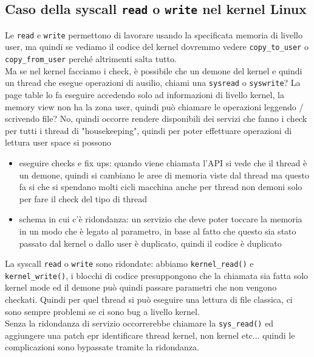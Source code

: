 \documentclass[12pt, oneside]{extbook}
\begin{document}
\subsection{Caso della syscall \texttt{read} o \texttt{write} nel kernel Linux}
Le \texttt{read} e \texttt{write} permettono di lavorare usando la specificata memoria di livello user, ma quindi se vediamo il codice del kernel dovremmo vedere \texttt{copy\_to\_user} o \texttt{copy\_from\_user} perché altrimenti salta tutto.\\Ma se nel kernel facciamo i check, è possibile che un demone del kernel e quindi un thread che esegue operazioni di ausilio, chiami una \texttt{sysread} o \texttt{syswrite}? La page table lo fa eseguire accedendo solo ad informazioni di livello kernel, la memory view non ha la zona user, quindi può chiamare le operazioni leggendo / scrivendo file? No, quindi occorre rendere disponibili dei servizi che fanno i check per tutti i thread di "housekeeping", quindi per poter effettuare operazioni di lettura user space si possono 
\begin{itemize}
\item eseguire checks e fix ups: quando viene chiamata l'API si vede che il thread è un demone, quindi si cambiano le aree di memoria viste dal thread ma questo fa si che si spendano molti cicli macchina anche per thread non demoni solo per fare il check del tipo di thread
\item schema in cui c'è ridondanza: un servizio che deve poter toccare la memoria in un modo che è legato al parametro, in base al fatto che questo sia stato passato dal kernel o dallo user è duplicato, quindi il codice è duplicato
\end{itemize}
La syscall \texttt{read} o \texttt{write} sono ridondate: abbiamo \texttt{kernel\_read()} e \texttt{kernel\_write()}, i blocchi di codice presuppongono che la chiamata sia fatta solo kernel mode ed il demone può quindi passare parametri che non vengono checkati. Quindi per quel thread si può eseguire una lettura di file classica, ci sono sempre problemi se ci sono bug a livello kernel.\\Senza la ridondanza di servizio occorrerebbe chiamare la \texttt{sys\_read()} ed aggiungere una patch epr identificare thread kernel, non kernel etc... quindi le complicazioni sono bypassate tramite la ridondanza.
\end{document}
